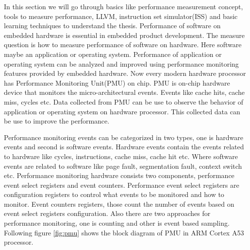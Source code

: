 \setlength{\parindent}{4em}
\setlength{\parskip}{1em}

In this section we will go through basics like performance measurement concept, tools to measure performance, LLVM, instruction set simulator(ISS) and basic learning techniques to understand the thesis. Performance of software on embedded hardware is essential in embedded product development. The measure question is how to measure performance of software on hardware. Here software maybe an application or operating system. Performance of application or operating system can be  analyzed and improved using performance monitoring features provided by embedded hardware. Now every modern hardware processor has Performance Monitoring Unit(PMU) on chip. PMU is on-chip hardware device that monitors the micro-architectural events. Events like cache hits, cache miss, cycles etc. Data collected from PMU can be use to observe the behavior of application or operating system on hardware processor. This collected data can be use to improve the performance. 

\par Performance monitoring events can be categorized in two types, one is hardware events and second is software events. Hardware events contain the events related to hardware like cycles, instructions, cache miss, cache hit etc. Where software events are related to software like page fault, segmentation fault, context switch etc. Performance monitoring hardware consists two components, performance event select registers and event counters. Performance event select registers are configuration registers to control what events to be monitored and how to monitor. Event counters registers, those count the number of events based on event select registers configuration. Also there are two approaches for performance monitoring, one is counting and other is event based sampling. Following figure \ref{fig:pmu} shows the block diagram of PMU in ARM Cortex A53 processor. 

